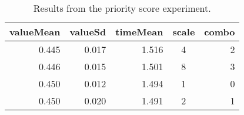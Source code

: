 \documentclass[11pt]{article}
\begin{document}
\begin{table}[ht]
\centering
\begin{tabular}{rrrcr}
  \hline
valueMean & valueSd & timeMean & scale & combo \\ 
  \hline
0.445 & 0.017 & 1.516 & 4 & 2 \\ 
  0.446 & 0.015 & 1.501 & 8 & 3 \\ 
  0.450 & 0.012 & 1.494 & 1 & 0 \\ 
  0.450 & 0.020 & 1.491 & 2 & 1 \\ 
   \hline
\end{tabular}
\caption{Results from the priority score experiment.} 
\end{table}
\end{document}
